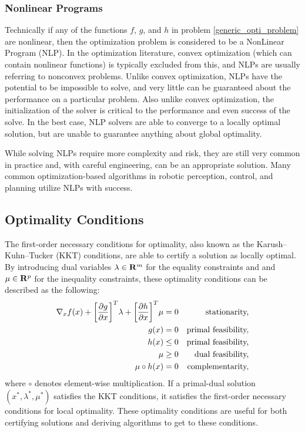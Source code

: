 \subsubsection{Nonlinear Programs}
%
Technically if any of the functions $f$, $g$, and $h$ in problem \eqref{generic_opti_problem} are nonlinear, then the optimization problem is considered to be a NonLinear Program (NLP). In the optimization literature, convex optimization (which can contain nonlinear functions) is typically excluded from this, and NLPs are usually referring to nonconvex problems. Unlike convex optimization, NLPs have the potential to be impossible to solve, and very little can be guaranteed about the performance on a particular problem. Also unlike convex optimization, the initialization of the solver is critical to the performance and even success of the solve. In the best case, NLP solvers are able to converge to a locally optimal solution, but are unable to guarantee anything about global optimality. 

While solving NLPs require more complexity and risk, they are still very common in practice and, with careful engineering, can be an appropriate solution. Many common optimization-based algorithms in robotic perception, control, and planning utilize NLPs with success.
%
\subsection{Optimality Conditions}
\label{sec:background:kkt}
%
The first-order necessary conditions for optimality, also known as the Karush–Kuhn–Tucker (KKT) conditions, are able to certify a solution as locally optimal. By introducing dual variables $\lambda \in \mathbf{R}^{m}$ for the equality constraints and and $\mu \in \mathbf{R}^{p}$ for the inequality constraints, these optimality conditions can be described as the following:
%
\begin{align}
    \nabla_x f(x) + \bigg[ \frac{\partial { g }}{ \partial { x }} \bigg] ^T \lambda + \bigg[ \frac{\partial { h }}{ \partial { x }} \bigg] ^T \mu &= 0 & \text{stationarity,} \\ 
    g(x) &= 0 & \text{primal feasibility,} \\ 
    h(x) &\leq 0 & \text{primal feasibility,} \\ 
    \mu & \geq 0 & \text{dual feasibility,} \\ 
    \mu \circ h(x) &= 0 & \text{complementarity,}
\end{align}
%
where $\circ$ denotes element-wise multiplication. If a primal-dual solution $(x^*, \lambda^*, \mu^*)$ satisfies the KKT conditions, it satisfies the first-order necessary conditions for local optimality. These optimality conditions are useful for both certifying solutions and deriving algorithms to get to these conditions. 
%
